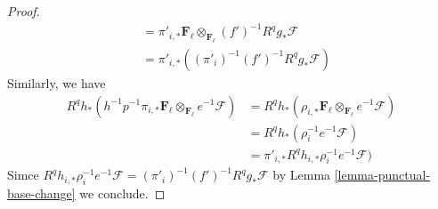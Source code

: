 \begin{proof}
\begin{align*}
& =
\pi'_{i, *}\mathbf{F}_\ell
\otimes_{\mathbf{F}_\ell} (f')^{-1}R^qg_*\mathcal{F} \\
& =
\pi'_{i, *}((\pi'_i)^{-1} (f')^{-1}R^qg_*\mathcal{F})
\end{align*}
Similarly, we have
\begin{align*}
R^qh_*(h^{-1}p^{-1} \pi_{i, *}\mathbf{F}_\ell
\otimes_{\mathbf{F}_\ell} e^{-1}\mathcal{F})
& =
R^qh_*(\rho_{i, *}\mathbf{F}_\ell
\otimes_{\mathbf{F}_\ell} e^{-1}\mathcal{F}) \\
& =
R^qh_*(\rho_i^{-1}e^{-1}\mathcal{F}) \\
& =
\pi'_{i, *}R^qh_{i, *} \rho_i^{-1}e^{-1}\mathcal{F})
\end{align*}
Simce
$R^qh_{i, *} \rho_i^{-1}e^{-1}\mathcal{F} = 
(\pi'_i)^{-1} (f')^{-1}R^qg_*\mathcal{F}$ by
Lemma \ref{lemma-punctual-base-change}
we conclude.
\end{proof}
